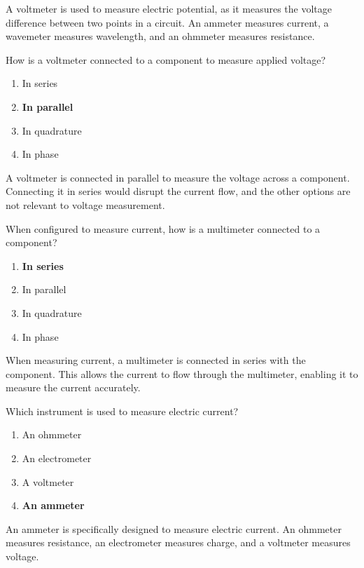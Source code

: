 A voltmeter is used to measure electric potential, as it measures the voltage difference between two points in a circuit. An ammeter measures current, a wavemeter measures wavelength, and an ohmmeter measures resistance.

\begin{tcolorbox}[colback=gray!10!white,colframe=black!75!black,title={T7D02}]
    How is a voltmeter connected to a component to measure applied voltage?
    \begin{enumerate}[label=\Alph*),noitemsep]
        \item In series
        \item \textbf{In parallel}
        \item In quadrature
        \item In phase
    \end{enumerate}
\end{tcolorbox}

A voltmeter is connected in parallel to measure the voltage across a component. Connecting it in series would disrupt the current flow, and the other options are not relevant to voltage measurement.

\begin{tcolorbox}[colback=gray!10!white,colframe=black!75!black,title={T7D03}]
    When configured to measure current, how is a multimeter connected to a component?
    \begin{enumerate}[label=\Alph*),noitemsep]
        \item \textbf{In series}
        \item In parallel
        \item In quadrature
        \item In phase
    \end{enumerate}
\end{tcolorbox}

When measuring current, a multimeter is connected in series with the component. This allows the current to flow through the multimeter, enabling it to measure the current accurately.

\begin{tcolorbox}[colback=gray!10!white,colframe=black!75!black,title={T7D04}]
    Which instrument is used to measure electric current?
    \begin{enumerate}[label=\Alph*),noitemsep]
        \item An ohmmeter
        \item An electrometer
        \item A voltmeter
        \item \textbf{An ammeter}
    \end{enumerate}
\end{tcolorbox}

An ammeter is specifically designed to measure electric current. An ohmmeter measures resistance, an electrometer measures charge, and a voltmeter measures voltage.
